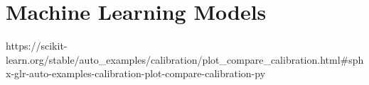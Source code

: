 \documentclass[../../main.tex]{subfiles}
\begin{document}

\section{Machine Learning Models}

https://scikit-learn.org/stable/auto_examples/calibration/plot_compare_calibration.html#sphx-glr-auto-examples-calibration-plot-compare-calibration-py

\end{document}
